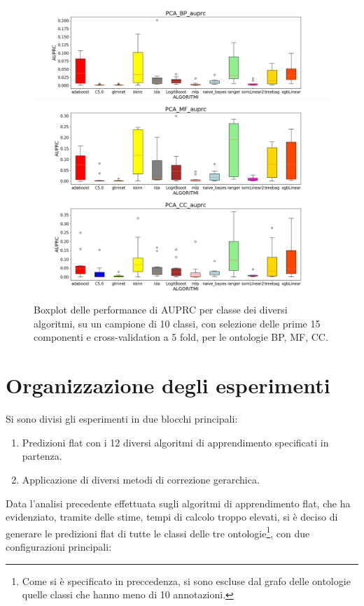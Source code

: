 \documentclass[12pt]{report}
\begin{document}
\begin{figure}[hp!]
\centering
\includegraphics[scale=0.37]{./images/PCA_BP_auprc.png}
\includegraphics[scale=0.37]{./images/PCA_MF_auprc.png}
\includegraphics[scale=0.37]{./images/PCA_CC_auprc.png}
\caption{\footnotesize{Boxplot delle performance di AUPRC per classe dei diversi algoritmi, su un campione di 10 classi, con selezione delle prime 15 componenti e cross-validation a 5 fold, per le ontologie BP, MF, CC.}}
\label{BPboxplotpca5fauprc}
\end{figure}
\newpage
\section{Organizzazione degli esperimenti}
Si sono divisi gli esperimenti in due blocchi principali:
\begin{enumerate}
\item Predizioni flat con i 12 diversi algoritmi di apprendimento specificati in partenza. 
\item Applicazione di diversi metodi di correzione gerarchica.
\end{enumerate}

Data l'analisi precedente effettuata sugli algoritmi di apprendimento flat, che ha evidenziato, tramite delle stime, tempi di calcolo troppo elevati, si è deciso di generare le predizioni flat di tutte le classi delle tre ontologie\footnote{\footnotesize{Come si è specificato in preccedenza, si sono escluse dal grafo delle ontologie quelle classi che hanno meno di 10 annotazioni.}}, con due configurazioni principali:
\end{document}
